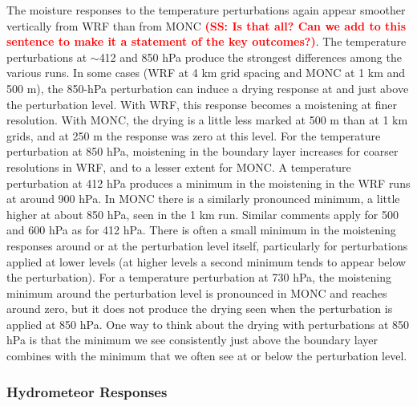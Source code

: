 \documentclass[draft]{agujournal2019}
\newcommand{\todo}[1]{\textcolor{red}{\textbf{(#1)}}}
\begin{document}
The moisture responses to the temperature perturbations again appear smoother
vertically from WRF than from MONC \todo{SS: Is that all?  Can we add to this
sentence to make it a statement of the key outcomes?}. The temperature
perturbations at $\sim$412 and 850 hPa produce the strongest differences among
the various runs. In some cases (WRF at 4 km grid spacing and MONC at 1 km and
500 m), the 850-hPa perturbation can induce a drying response at and just above
the perturbation level. With WRF, this response becomes a moistening at finer
resolution. With MONC, the drying is a little less marked at 500 m than at 1 km
grids, and at 250 m the response was zero at this level. For the temperature
perturbation at 850 hPa, moistening in the boundary layer increases for coarser
resolutions in WRF, and to a lesser extent for MONC. A temperature perturbation
at 412 hPa produces a minimum in the moistening in the WRF runs at around 900
hPa. In MONC there is a similarly pronounced minimum, a little higher at about
850 hPa, seen in the 1 km run. Similar comments apply for 500 and 600 hPa as for
412 hPa. There is often a small minimum in the moistening responses around or at
the perturbation level itself, particularly for perturbations applied at lower
levels (at higher levels a second minimum tends to appear below the
perturbation). For a temperature perturbation at 730 hPa, the moistening minimum
around the perturbation level is pronounced in MONC and reaches around zero, but
it does not produce the drying seen when the perturbation is applied at 850 hPa.
One way to think about the drying with perturbations at 850 hPa is that the
minimum we see consistently just above the boundary layer combines with the
minimum that we often see at or below the perturbation level.

\subsubsection{Hydrometeor Responses}
\end{document}
